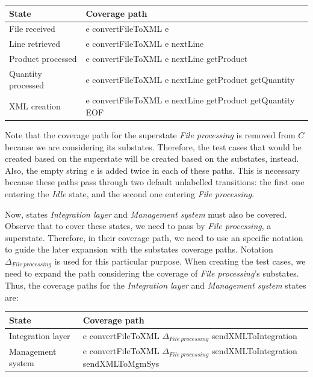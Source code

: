 \begin{center}
\begin{tabular}{| l | l|}

\hline

State & Coverage path \\ \hline

File received & e convertFileToXML e \\ \hline

Line retrieved & e convertFileToXML e nextLine\\ \hline

Product processed & e convertFileToXML e nextLine getProduct\\ \hline

Quantity processed & e convertFileToXML e nextLine getProduct getQuantity\\ \hline

XML creation & e convertFileToXML e nextLine getProduct getQuantity EOF\\ 

\hline
\end{tabular}
\end{center}

Note that the coverage path for the superstate \textit{File processing} is removed from $C$ because we are considering its substates. Therefore, the test cases that would be created based on the superstate will be created based on the substates, instead. Also, the empty string $e$ is added twice in each of these paths. This is necessary because these paths pass through two default unlabelled transitions: the first one entering the \textit{Idle} state, and the second one entering \textit{File processing}.

Now, states \textit{Integration layer} and \textit{Management system} must also be covered. Observe that to cover these states, we need to pass by \textit{File processing}, a superstate. Therefore, in their coverage path, we need to use an specific notation to guide the later expansion with the substates coverage paths. Notation $\Delta_{File\ processing}$ is used for this particular purpose. When creating the test cases, we need to expand the path considering the coverage of \textit{File processing}'s substates. Thus, the coverage paths for the \textit{Integration layer} and \textit{Management system} states are:

\begin{center}
\begin{tabular}{| l | p{10cm}|}

\hline

State & Coverage path \\ \hline

Integration layer & e convertFileToXML $\Delta_{File\ processing}$ sendXMLToIntegration \\ \hline

Management system & e convertFileToXML $\Delta_{File\ processing}$ sendXMLToIntegration sendXMLToMgmSys\\

\hline
\end{tabular}
\end{center}


